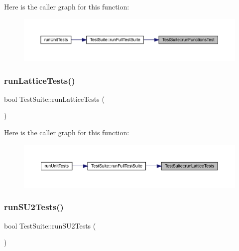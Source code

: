 Here is the caller graph for this function\+:\nopagebreak
\begin{figure}[H]
\begin{center}
\leavevmode
\includegraphics[width=350pt]{class_test_suite_af257c555a7fff6934523f80b9c59309c_icgraph}
\end{center}
\end{figure}
\mbox{\label{class_test_suite_aa24e7ab393007d18d027fe95c5a3ec58}} 
\subsubsection{\texorpdfstring{runLatticeTests()}{runLatticeTests()}}
{\footnotesize\ttfamily bool Test\+Suite\+::run\+Lattice\+Tests (\begin{DoxyParamCaption}{ }\end{DoxyParamCaption})}

Here is the caller graph for this function\+:\nopagebreak
\begin{figure}[H]
\begin{center}
\leavevmode
\includegraphics[width=350pt]{class_test_suite_aa24e7ab393007d18d027fe95c5a3ec58_icgraph}
\end{center}
\end{figure}
\mbox{\label{class_test_suite_a904ac34cad4166c281f7dbce9a682b2c}} 
\subsubsection{\texorpdfstring{runSU2Tests()}{runSU2Tests()}}
{\footnotesize\ttfamily bool Test\+Suite\+::run\+S\+U2\+Tests (\begin{DoxyParamCaption}{ }\end{DoxyParamCaption})}

